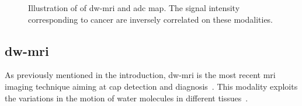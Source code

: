 \begin{figure}
\centering
	\hspace*{\fill}
	 \hfill
	\hspace*{\fill}
	\caption[Example of \acs*{dw}-\acs*{mri} and \acs*{dce} map.]{Illustration of of \acs*{dw}-\acs*{mri} and \acs*{adc} map. The signal intensity corresponding to cancer are inversely correlated on these modalities.}
	\label{fig:dwi}
\end{figure}

\subsection{\acs*{dw}-\acs*{mri}}\label{subsec:chp2:imaging:dw}
As previously mentioned in the introduction, \ac{dw}-\ac{mri} is the most recent \ac{mri} imaging technique aiming at \ac{cap} detection and diagnosis~\cite{Scheidler1999}.
This modality exploits the variations in the motion of water molecules in different tissues~\cite{LeBihan1988,Koh2007}.

